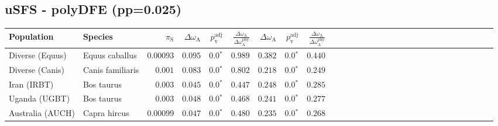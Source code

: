 \subsection{uSFS - polyDFE (pp=0.025)} 
\begin{center}
\begin{adjustbox}{width = 1\textwidth}
\begin{tabular}{|l|l|r|r|r|r|r|r|r|r|r|r|r|r|r|r|r|r|r|r|r|r|r|r|r|r|r|r|r|}
\toprule
                     Population &              Species & $\pi_{\textrm{S}}$ & $\Delta \omega_{\mathrm{A}} $ & $p_{\mathrm{v}}^{\mathrm{adj}}$ & $\frac{\Delta\omega_{\mathrm{A}}}{\Delta\omega_{\mathrm{A}}^{\mathrm{phy}}}$ & $\Delta \omega_{\mathrm{A}} $ & $p_{\mathrm{v}}^{\mathrm{adj}}$ & $\frac{\Delta\omega_{\mathrm{A}}}{\Delta\omega_{\mathrm{A}}^{\mathrm{phy}}}$ \\
\midrule
                Diverse (Equus) &       Equus caballus &          $0.00093$ &                      $ 0.095$ &                  $\bm{0.0{^*}}$ &                                           $ 0.989$ &                      $ 0.382$ &                  $\bm{0.0{^*}}$ &                                           $ 0.440$ \\
                Diverse (Canis) &     Canis familiaris &           $ 0.001$ &                      $ 0.083$ &                  $\bm{0.0{^*}}$ &                                           $ 0.802$ &                      $ 0.218$ &                  $\bm{0.0{^*}}$ &                                           $ 0.249$ \\
                    Iran (IRBT) &           Bos taurus &           $ 0.003$ &                      $ 0.045$ &                  $\bm{0.0{^*}}$ &                                           $ 0.447$ &                      $ 0.248$ &                  $\bm{0.0{^*}}$ &                                           $ 0.285$ \\
                  Uganda (UGBT) &           Bos taurus &           $ 0.003$ &                      $ 0.048$ &                  $\bm{0.0{^*}}$ &                                           $ 0.468$ &                      $ 0.241$ &                  $\bm{0.0{^*}}$ &                                           $ 0.277$ \\
               Australia (AUCH) &         Capra hircus &          $0.00099$ &                      $ 0.047$ &                  $\bm{0.0{^*}}$ &                                           $ 0.480$ &                      $ 0.235$ &                  $\bm{0.0{^*}}$ &                                           $ 0.268$ \\

\end{tabular}
\end{adjustbox}
\end{center}
